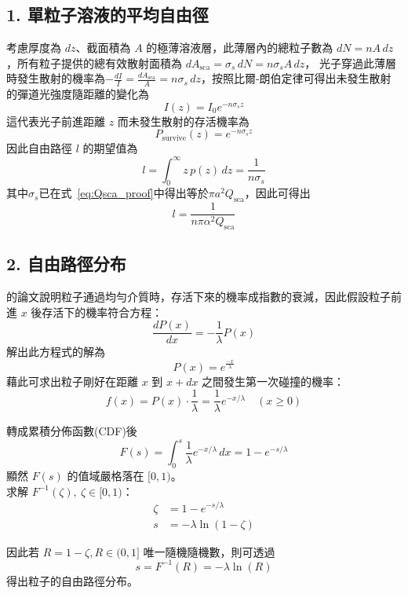 
\subsection*{1. 單粒子溶液的平均自由徑}
考慮厚度為 \(dz\)、截面積為 \(A\) 的極薄溶液層，此薄層內的總粒子數為 \(dN = n A \, dz\)，所有粒子提供的總有效散射面積為 \(dA_{\text{sca}} = \sigma_s \, dN = n \sigma_s A \, dz\)，
光子穿過此薄層時發生散射的機率為\(-\frac{dI}{I}=\frac{dA_{\text{sca}}}{A}=n\sigma _{s}\,dz\)，按照比爾-朗伯定律\parencite{https://doi.org/10.1002/andp.18521620505}可得出未發生散射的彈道光強度隨距離的變化為
\begin{equation}
    I(z)=I_{0}e^{-n\sigma _{s}z}
\end{equation}
這代表光子前進距離 \(z\) 而未發生散射的存活機率為 
\begin{equation}
    P_{\text{survive}}(z) = e^{-n \sigma_s z}
\end{equation}
因此自由路徑 $l$ 的期望值為
\begin{equation}
    l = \int^{\infty} _0 z\,p(z)\,dz=\frac{1}{n\sigma_s}
\end{equation}
其中$\sigma_s$已在式~\ref{eq:Qsca_proof}中得出等於$\pi a^2 Q_{\text{sca}}$，因此可得出
\begin{equation}
    l = \frac{1}{n \pi \alpha^2 Q_{\text{sca}}}
\end{equation}
\subsection*{2. 自由路徑分布}
\textcite{https://doi.org/10.1002/andp.18521620505}的論文說明粒子通過均勻介質時，存活下來的機率成指數的衰減，因此假設粒子前進 $x$ 後存活下的機率符合方程：
\begin{equation}
    \frac{d P \left(x\right)}{dx}=-\frac{1}{\lambda} P(x)
\end{equation}
解出此方程式的解為
\begin{equation}
    P(x) = e^{\frac{-x}{\lambda}}
\end{equation}
藉此可求出粒子剛好在距離 \(x\) 到 \(x + dx\) 之間發生第一次碰撞的機率：
\begin{equation}
    f(x)=P(x)\cdot \frac{1}{\lambda }=\frac{1}{\lambda }e^{-x/\lambda }\quad (x\ge 0)
\end{equation}

轉成累積分佈函數(CDF)後
\begin{equation}
    F(s)=\int _{0}^{s}\frac{1}{\lambda }e^{-x/\lambda }\,dx=1-e^{-s/\lambda }
\end{equation}
顯然 $F(s)$ 的值域嚴格落在 $[0,1)$。\\
求解 $F^{-1}(\zeta),\ \zeta \in [0,1)$：
\begin{align}
    \zeta &= 1-e^{-s/\lambda } \\
    s &= -\lambda \ln\left(1 - \zeta\right)
\end{align}

因此若 $R = 1-\zeta , R \in (0,1] $ 唯一隨機隨機數，則可透過
\begin{equation}
    s = F^{-1}\left(R\right) = -\lambda \ln \left(R\right) \label{eq:mean_free_path}
\end{equation}
得出粒子的自由路徑分布。